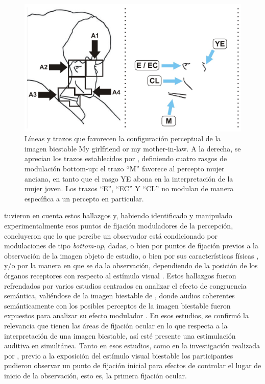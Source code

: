 \documentclass[spanish]{textolivre}
\begin{document}
\begin{figure}
\centering
\begin{minipage}{.85\textwidth}
    \centering
    \includegraphics[width=\linewidth]{Fig1.jpeg}
    \caption{Líneas y trazos que favorecen la configuración perceptual de la imagen biestable My girlfriend or my mother-in-law. A la derecha, se aprecian los trazos establecidos por \textcite{groner_eye-movement_1983}, definiendo cuatro rasgos de modulación bottom-up: el trazo “M” favorece al percepto mujer anciana, en tanto que el rasgo YE abona en la interpretación de la mujer joven. Los trazos “E”, “EC” Y “CL” no modulan de manera específica a un percepto en particular.}
    \label{fig1}
\end{minipage}
\end{figure}

\textcite{hsiao_assessing_2012} tuvieron en cuenta estos hallazgos y, habiendo identificado y manipulado experimentalmente esos puntos de fijación moduladores de la percepción, concluyeron que lo que percibe un observador está condicionado por modulaciones de tipo \textit{bottom-up}, dadas, o bien por puntos de fijación previos a la observación de la imagen objeto de estudio, o bien por sus características físicas \cite{chastain_first_1975}, y/o por la manera en que se da la observación, dependiendo de la posición de los órganos receptores con respecto al estímulo visual \cite{polgari_novel_2020}. Estos hallazgos fueron refrendados por varios estudios centrados en analizar el efecto de congruencia semántica, valiéndose de la imagen biestable de \textcite{boring_new_1930}, donde audios coherentes semánticamente con los posibles perceptos de la imagen biestable fueron expuestos para analizar su efecto modulador \cite{hsiao_assessing_2012,marroquin-ciendua_modulacion_2020,rodriguez-martinez_ocular_2021}. En esos estudios, se confirmó la relevancia que tienen las áreas de fijación ocular en lo que respecta a la interpretación de una imagen biestable, así esté presente una estimulación auditiva en simultánea. Tanto en esos estudios, como en la investigación realizada por \textcite{hsiao_assessing_2012}, previo a la exposición del estímulo visual biestable los participantes pudieron observar un punto de fijación inicial para efectos de controlar el lugar de inicio de la observación, esto es, la primera fijación ocular.
\end{document}
